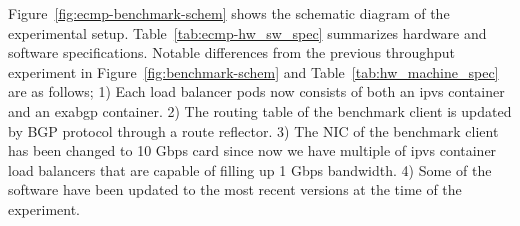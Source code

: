 Figure~\ref{fig:ecmp-benchmark-schem} shows the schematic diagram of the experimental setup. Table~\ref{tab:ecmp-hw_sw_spec} summarizes hardware and software specifications.
Notable differences from the previous throughput experiment in Figure~\ref{fig:benchmark-schem} and Table~\ref{tab:hw_machine_spec} are as follows;
1) Each load balancer pods now consists of both an ipvs container and an exabgp container.
2) The routing table of the benchmark client is updated by BGP protocol through a route reflector.
3) The NIC of the benchmark client has been changed to 10 Gbps card since now we have multiple of ipvs container load balancers that are capable of filling up 1 Gbps bandwidth.
4) Some of the software have been updated to the most recent versions at the time of the experiment.

\FloatBarrier


